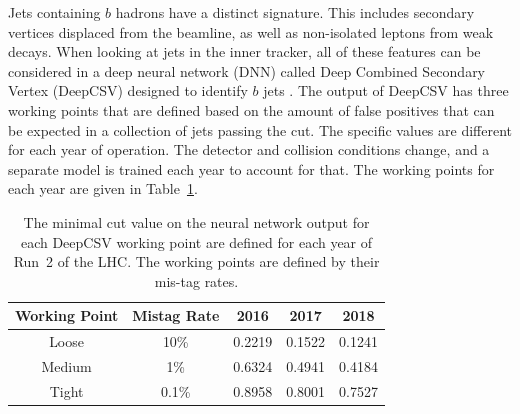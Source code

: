Jets containing $b$ hadrons have a distinct signature.
This includes secondary vertices displaced from the beamline,
as well as non-isolated leptons from weak decays.
When looking at jets in the inner tracker,
all of these features can be considered in a deep neural network (DNN)
called Deep Combined Secondary Vertex (DeepCSV)
designed to identify $b$ jets \cite{Sirunyan_2018}.
The output of DeepCSV has three working points
that are defined based on the amount of false positives that can be expected
in a collection of jets passing the cut.
The specific values are different for each year of operation.
The detector and collision conditions change,
and a separate model is trained each year to account for that.
The working points for each year are given in Table~\ref{tab:deepcsv}.
\begin{table}
  \centering
  \caption[DeepCSV working points]{
    The minimal cut value on the neural network output for each DeepCSV working point
    are defined for each year of Run~2 of the LHC.
    The working points are defined by their mis-tag rates.
  }
  {\renewcommand{\arraystretch}{1.5}
  \begin{tabular}{|c | c | c c c|}
    \hline
    Working Point & Mistag Rate & 2016 & 2017 & 2018 \\
    \hline
    Loose  &  10\% & 0.2219 & 0.1522 & 0.1241 \\
    Medium &   1\% & 0.6324 & 0.4941 & 0.4184 \\
    Tight  & 0.1\% & 0.8958 & 0.8001 & 0.7527 \\
    \hline
  \end{tabular}
  }
  \label{tab:deepcsv}
\end{table}

